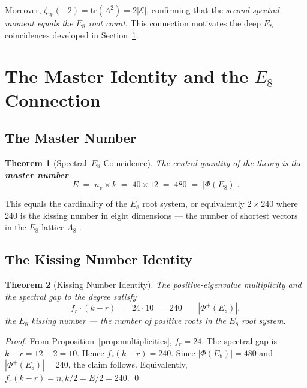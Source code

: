 \documentclass[12pt,a4paper]{article}
\newtheorem{theorem}{Theorem}[section]
\newcommand{\Eone}{E_8}
\newcommand{\nv}{n_{\!v}}
\newcommand{\fr}{f_{\!r}}
\newcommand{\zetaW}{\zeta_{\!W}}
\begin{document}
Moreover, $\zetaW(-2) = \mathrm{tr}(A^2) = 2|\mathcal{E}|$, confirming that
the \emph{second spectral moment equals the $E_8$ root count}.
This connection motivates the deep $E_8$ coincidences developed
in Section~\ref{sec:master}.

\section{The Master Identity and the $E_8$ Connection}
\label{sec:master}

\subsection{The Master Number}

\begin{theorem}[Spectral--$\Eone$ Coincidence]
The central quantity of the theory is the \textbf{master number}
\[
  \boxed{E \;=\; \nv \times k \;=\; 40 \times 12 \;=\; 480 \;=\; |\Phi(\Eone)|.}
\]
\end{theorem}

This equals the cardinality of the $\Eone$ root system, or
equivalently $2\times 240$ where 240 is the kissing number in eight
dimensions --- the number of shortest vectors in the $\Eone$ lattice
$\Lambda_8$ \cite{Viazovska2017}.

\subsection{The Kissing Number Identity}

\begin{theorem}[Kissing Number Identity]
\label{thm:kissing}
The positive-eigenvalue multiplicity and the spectral gap to the
degree satisfy
\[
  \boxed{\fr\cdot(k - r) \;=\; 24 \cdot 10 \;=\; 240 \;=\; |\Phi^+(\Eone)|,}
\]
the $E_8$ kissing number --- the number of positive roots in the
$\Eone$ root system.
\end{theorem}

\begin{proof}
From Proposition~\ref{prop:multiplicities}, $\fr = 24$.  The spectral
gap is $k - r = 12 - 2 = 10$.  Hence $\fr(k-r) = 240$.
Since $|\Phi(\Eone)| = 480$ and $|\Phi^+(\Eone)| = 240$, the claim
follows.  Equivalently, $\fr(k-r) = \nv k/2 = E/2 = 240$. \qed
\end{proof}
\end{document}
